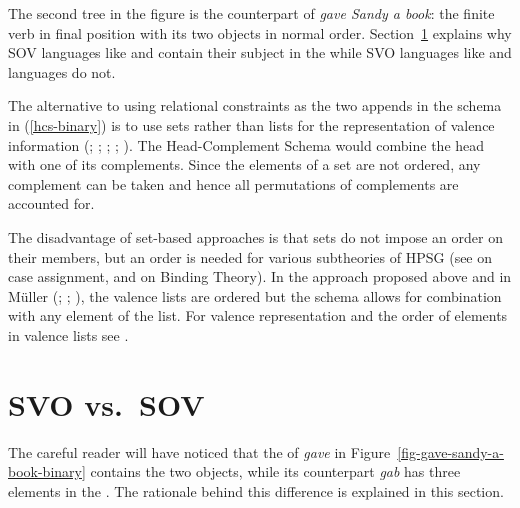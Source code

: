 \documentclass[output=paper,biblatex,babelshorthands,newtxmath,draftmode,colorlinks,citecolor=brown]{langscibook}
\begin{document}
The second tree in the figure is the  counterpart of \emph{gave Sandy a book}: the finite verb
in final position with its two objects in normal order. Section~\ref{sec-svo-sov} explains why SOV
languages like  and  contain their subject in the \compsl while SVO languages like
 and  languages do not.

The alternative to using relational constraints as the two appends in the schema in (\ref{hcs-binary}) is to
use sets rather than lists for the representation of valence information
(\citealp[Section~4]{Gunji86a}; \citealp[]{HN89a}; \citealp[]{Pollard90a-Eng};
\citealp[]{Oliva92b}; \citealp*[]{EEU92a}). The Head-Complement Schema would
combine the head with one of its complements. Since the elements of a set are not ordered, any
complement can be taken and hence all permutations of complements are accounted for. 

The disadvantage of set-based approaches is that sets do not impose an order on their members, but
an order is needed for various subtheories of HPSG (see  on case assignment,
and  on Binding Theory). In the approach proposed above and in Müller
(\citeyear[]{Mueller2005c}; \citeyear[]{MuellerHPSGHandbook}; \citeyear[--54]{MuellerCoreGram}), the valence lists are ordered but the schema allows for combination with
any element of the list. For valence representation and the order of elements in valence lists see
.\label{order:page-scrambling-end}


\section{SVO vs.\ SOV}
\label{sec-svo-sov}

\largerpage[2]
The careful reader will have noticed that the \compsl of
\emph{gave} in Figure~\ref{fig-gave-sandy-a-book-binary} contains the two objects, while its
 counterpart \emph{gab} has three elements in the \compsl. The rationale behind this
difference is explained in this section.
\end{document}
